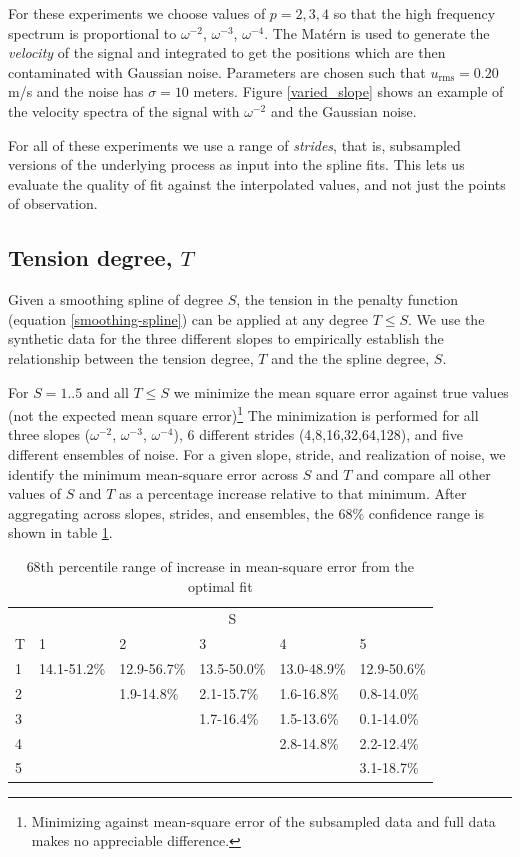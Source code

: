 \documentclass[10pt,journal]{IEEEtran}
\begin{document}
For these experiments we choose values of $p=2,3,4$ so that the high frequency spectrum is proportional to $\omega^{-2}$, $\omega^{-3}$, $\omega^{-4}$. The Mat\'ern is used to generate the \emph{velocity} of the signal and integrated to get the positions which are then contaminated with Gaussian noise. Parameters are chosen such that $u_{\textrm{rms}}=0.20$ m/s and the noise has $\sigma=10$ meters. Figure \ref{varied_slope} shows an example of the velocity spectra of the signal with $\omega^{-2}$ and the Gaussian noise.

For all of these experiments we use a range of \emph{strides}, that is, subsampled versions of the underlying process as input into the spline fits. This lets us evaluate the quality of fit against the interpolated values, and not just the points of observation.

\subsection{Tension degree, $T$} \label{tension_degree}

Given a smoothing spline of degree $S$, the tension in the penalty function (equation \ref{smoothing-spline}) can be applied at any degree $T\leq S$. We use the synthetic data for the three different slopes to empirically establish the relationship between the tension degree, $T$ and the the spline degree, $S$. 

For $S=1..5$ and all $T\leq S$ we minimize the mean square error against true values (not the expected mean square error)\footnote{Minimizing against mean-square error of the subsampled data and full data makes no appreciable difference.} The minimization is performed for all three slopes ($\omega^{-2}$, $\omega^{-3}$, $\omega^{-4}$), 6 different strides (4,8,16,32,64,128), and five different ensembles of noise. For a given slope, stride, and realization of noise, we identify the minimum mean-square error across $S$ and $T$ and compare all other values of $S$ and $T$ as a percentage increase relative to that minimum. After aggregating across slopes, strides, and ensembles, the 68\% confidence range is shown in table \ref{optimal_T}.

\begin{table}[ht]
\caption{68th percentile range of increase in mean-square error from the optimal fit}
\label{optimal_T}
\centering
\begin{tabular}{l *{5}{l}}
\toprule & \multicolumn{5}{c}{S} \\ 
\cmidrule(lr){2-6} 
T & 1 & 2 & 3 & 4 & 5 \\ \midrule 
1 & 14.1-51.2\% & 12.9-56.7\% & 13.5-50.0\% & 13.0-48.9\% & 12.9-50.6\% \\ 
2 & & 1.9-14.8\% & 2.1-15.7\% & 1.6-16.8\% & 0.8-14.0\% \\ 
3 & & & 1.7-16.4\% & 1.5-13.6\% & 0.1-14.0\% \\ 
4 & & & & 2.8-14.8\% & 2.2-12.4\% \\ 
5 & & & & & 3.1-18.7\% \\ 
 \bottomrule 
\end{tabular} 
\end{table}
\end{document}
